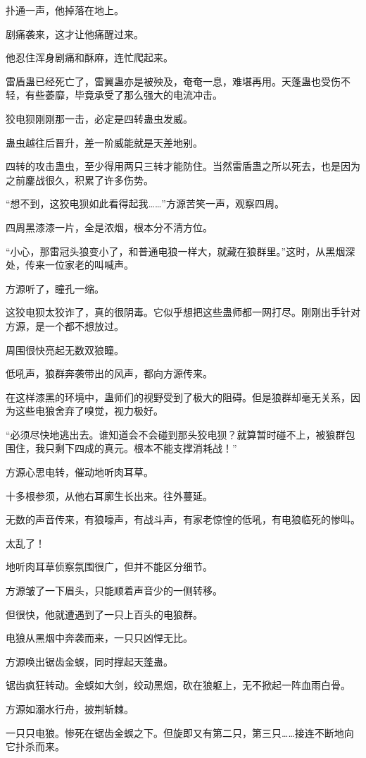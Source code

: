 \begin{this_body}
扑通一声，他掉落在地上。

剧痛袭来，这才让他痛醒过来。

他忍住浑身剧痛和酥麻，连忙爬起来。

雷盾蛊已经死亡了，雷翼蛊亦是被殃及，奄奄一息，难堪再用。天蓬蛊也受伤不轻，有些萎靡，毕竟承受了那么强大的电流冲击。

狡电狈刚刚那一击，必定是四转蛊虫发威。

蛊虫越往后晋升，差一阶威能就是天差地别。

四转的攻击蛊虫，至少得用两只三转才能防住。当然雷盾蛊之所以死去，也是因为之前鏖战很久，积累了许多伤势。

“想不到，这狡电狈如此看得起我……”方源苦笑一声，观察四周。

四周黑漆漆一片，全是浓烟，根本分不清方位。

“小心，那雷冠头狼变小了，和普通电狼一样大，就藏在狼群里。”这时，从黑烟深处，传来一位家老的叫喊声。

方源听了，瞳孔一缩。

这狡电狈太狡诈了，真的很阴毒。它似乎想把这些蛊师都一网打尽。刚刚出手针对方源，是一个都不想放过。

周围很快亮起无数双狼瞳。

低吼声，狼群奔袭带出的风声，都向方源传来。

在这样漆黑的环境中，蛊师们的视野受到了极大的阻碍。但是狼群却毫无关系，因为这些电狼舍弃了嗅觉，视力极好。

“必须尽快地逃出去。谁知道会不会碰到那头狡电狈？就算暂时碰不上，被狼群包围住，我只剩下四成的真元。根本不能支撑消耗战！”

方源心思电转，催动地听肉耳草。

十多根参须，从他右耳廓生长出来。往外蔓延。

无数的声音传来，有狼嚎声，有战斗声，有家老惊惶的低吼，有电狼临死的惨叫。

太乱了！

地听肉耳草侦察氛围很广，但并不能区分细节。

方源皱了一下眉头，只能顺着声音少的一侧转移。

但很快，他就遭遇到了一只上百头的电狼群。

电狼从黑烟中奔袭而来，一只只凶悍无比。

方源唤出锯齿金蜈，同时撑起天蓬蛊。

锯齿疯狂转动。金蜈如大剑，绞动黑烟，砍在狼躯上，无不掀起一阵血雨白骨。

方源如溺水行舟，披荆斩棘。

一只只电狼。惨死在锯齿金蜈之下。但旋即又有第二只，第三只……接连不断地向它扑杀而来。


\end{this_body}
